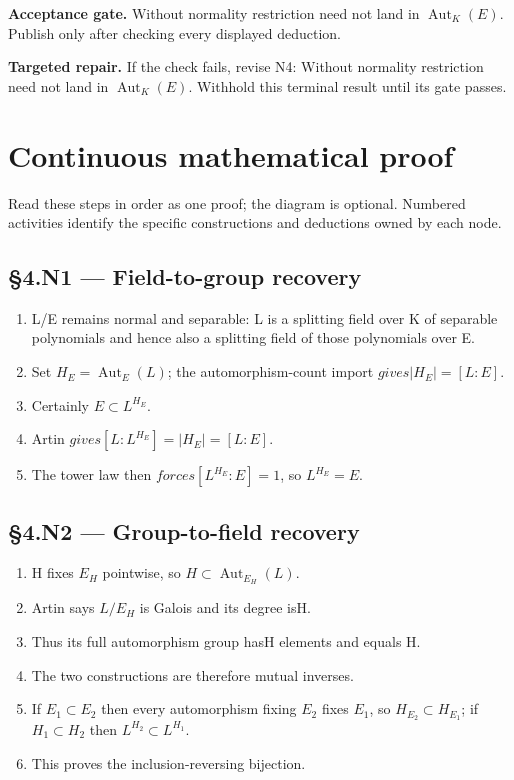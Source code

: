 \documentclass[preprint,12pt,aps,pra,showkeys,amsmath,amssymb,superscriptaddress,floatfix]{revtex4-2}
\theoremstyle{definition}
\theoremstyle{remark}
\newcommand{\field}[2]{\par\smallskip\noindent\textbf{#1.} #2\par}
\begin{document}
\field{Acceptance gate}{Without normality restriction need not land in
\(\operatorname{Aut} _K(E)\). Publish only after checking every
displayed deduction.}

\field{Targeted repair}{If the check fails, revise N4: Without normality restriction need not
land in \(\operatorname{Aut} _K(E)\). Withhold this terminal result
until its gate passes.}

\endgroup\clearpage\section{Continuous mathematical proof}\label{sec:proof}

Read these steps in order as one proof; the diagram is optional.
Numbered activities identify the specific constructions and deductions
owned by each node.

\subsection{§4.N1 --- Field-to-group
recovery}\label{n1-field-to-group-recovery}

\begin{enumerate}
\def\labelenumi{\arabic{enumi}.}
\item
  L/E remains normal and separable: L is a splitting field over K of
  separable polynomials and hence also a splitting field of those
  polynomials over E.
\item
  Set \(H_E=\operatorname{Aut} _E(L)\); the automorphism-count import
  \(gives|H_E|=[L:E]\).
\item
  Certainly \(E\subset L^{H_E}\).
\item
  Artin \(gives[L:L^{H_E}]=|H_E|=[L:E]\).
\item
  The tower law then \(forces[L^{H_E}:E]=1\), so \(L^{H_E}=E\).
\end{enumerate}

\subsection{§4.N2 --- Group-to-field
recovery}\label{n2-group-to-field-recovery}

\begin{enumerate}
\def\labelenumi{\arabic{enumi}.}
\item
  H fixes \(E_H\) pointwise, so
  \(H\subset \operatorname{Aut} _{E_H}(L)\).
\item
  Artin says \(L/E_H\) is Galois and its degree is\textbar H\textbar.
\item
  Thus its full automorphism group has\textbar H\textbar{} elements and
  equals H.
\item
  The two constructions are therefore mutual inverses.
\item
  If \(E_{1}\subset E_{2}\) then every automorphism fixing \(E_{2}\)
  fixes \(E_{1}\), so \(H_{E_{2}}\subset H_{E_{1}}\); if
  \(H_{1}\subset H_{2}\) then \(L^{H_{2}}\subset L^{H_{1}}\).
\item
  This proves the inclusion-reversing bijection.
\end{enumerate}
\end{document}
